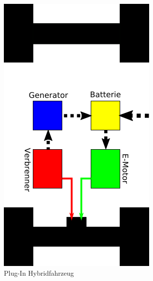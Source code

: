 \begin{figure}[htb]
\begin{minipage}[t]{0.45\linewidth}
        \includegraphics[width=0.8\linewidth]{img/PHEV3.png}
        \caption{Plug-In \newline Hybridfahrzeug}
        \label{PHEV}
	\end{minipage}
\end{figure}

